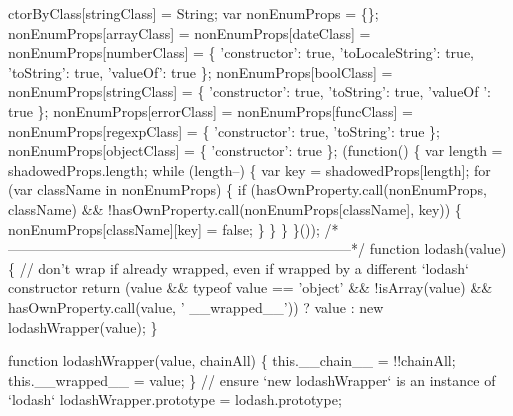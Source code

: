 \begin{DoxyCodeInclude}
\textcolor{stringliteral}{    ctorByClass[stringClass] = String;}
\textcolor{stringliteral}{}
\textcolor{stringliteral}{    var nonEnumProps = \{\};}
\textcolor{stringliteral}{    nonEnumProps[arrayClass] = nonEnumProps[dateClass] = nonEnumProps[numberClass] = \{ '}constructor\textcolor{stringliteral}{': true,
       '}toLocaleString\textcolor{stringliteral}{': true, '}toString\textcolor{stringliteral}{': true, '}valueOf\textcolor{stringliteral}{': true \};}
\textcolor{stringliteral}{    nonEnumProps[boolClass] = nonEnumProps[stringClass] = \{ '}constructor\textcolor{stringliteral}{': true, '}toString\textcolor{stringliteral}{': true, '}valueOf\textcolor{stringliteral}{
      ': true \};}
\textcolor{stringliteral}{    nonEnumProps[errorClass] = nonEnumProps[funcClass] = nonEnumProps[regexpClass] = \{ '}constructor\textcolor{stringliteral}{': true,
       '}toString\textcolor{stringliteral}{': true \};}
\textcolor{stringliteral}{    nonEnumProps[objectClass] = \{ '}constructor\textcolor{stringliteral}{': true \};}
\textcolor{stringliteral}{}
\textcolor{stringliteral}{    (function() \{}
\textcolor{stringliteral}{      var length = shadowedProps.length;}
\textcolor{stringliteral}{      while (length--) \{}
\textcolor{stringliteral}{        var key = shadowedProps[length];}
\textcolor{stringliteral}{        for (var className in nonEnumProps) \{}
\textcolor{stringliteral}{          if (hasOwnProperty.call(nonEnumProps, className) && !hasOwnProperty.call(nonEnumProps[className],
       key)) \{}
\textcolor{stringliteral}{            nonEnumProps[className][key] = false;}
\textcolor{stringliteral}{          \}}
\textcolor{stringliteral}{        \}}
\textcolor{stringliteral}{      \}}
\textcolor{stringliteral}{    \}());}
\textcolor{stringliteral}{}
\textcolor{stringliteral}{    /*--------------------------------------------------------------------------*/}
\textcolor{stringliteral}{}
\textcolor{stringliteral}{    function lodash(value) \{}
\textcolor{stringliteral}{      // don'}t wrap \textcolor{keywordflow}{if} already wrapped, even \textcolor{keywordflow}{if} wrapped by a different `lodash` constructor
      \textcolor{keywordflow}{return} (value && typeof value == \textcolor{stringliteral}{'object'} && !isArray(value) && hasOwnProperty.call(value, \textcolor{stringliteral}{'
      \_\_wrapped\_\_'}))
       ? value
       : \textcolor{keyword}{new} lodashWrapper(value);
    \}

    \textcolor{keyword}{function} lodashWrapper(value, chainAll) \{
      this.\_\_chain\_\_ = !!chainAll;
      this.\_\_wrapped\_\_ = value;
    \}
    \textcolor{comment}{// ensure `new lodashWrapper` is an instance of `lodash`}
    lodashWrapper.prototype = lodash.prototype;


\end{DoxyCodeInclude}
